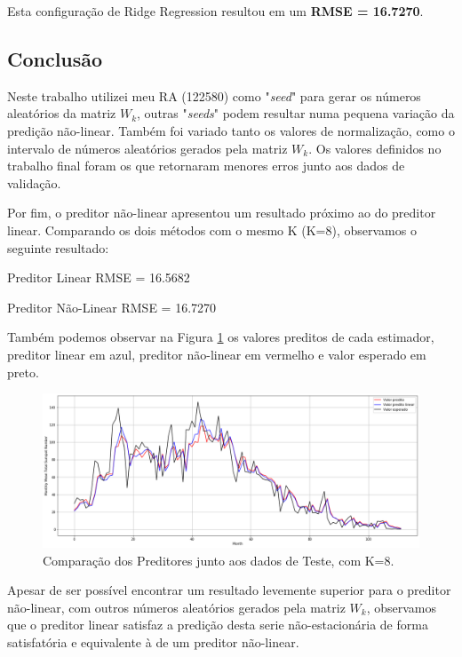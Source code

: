 \documentclass[12pt]{article}
\begin{document}
Esta configuração de Ridge Regression resultou em um \textbf{RMSE = 16.7270}. 
\pagebreak
\subsection*{Conclusão}

Neste trabalho utilizei meu RA (122580) como "\textit{seed}" para gerar os números aleatórios da matriz $W_k$, outras "\textit{seeds}" podem resultar numa pequena variação da predição não-linear. Também foi variado tanto os valores de normalização, como o intervalo de números aleatórios gerados pela matriz $W_k$. Os valores definidos no trabalho final foram os que retornaram menores erros junto aos dados de validação. 

Por fim, o preditor não-linear apresentou um resultado próximo ao do preditor linear. Comparando os dois métodos com o mesmo K (K=8), observamos o seguinte resultado:

\begin{center}
	Preditor Linear \hspace{1.8cm}  RMSE = 16.5682 
	
	Preditor Não-Linear \hspace{1cm}  RMSE = 16.7270 
\end{center}

Também podemos observar na Figura \ref{fig:compare_test} os valores preditos de cada estimador, preditor linear em azul, preditor não-linear em vermelho e valor esperado em preto.

\begin{figure}[h!]
	\centering
	\includegraphics[width=\linewidth]{compare_test.png}
	\caption{Comparação dos Preditores junto aos dados de Teste, com K=8.}
	\label{fig:compare_test}
\end{figure}

Apesar de ser possível encontrar um resultado levemente superior para o preditor não-linear, com outros números aleatórios gerados pela matriz $W_k$, observamos que o preditor linear satisfaz a predição desta serie não-estacionária de forma satisfatória e equivalente à de um preditor não-linear.
\end{document}
